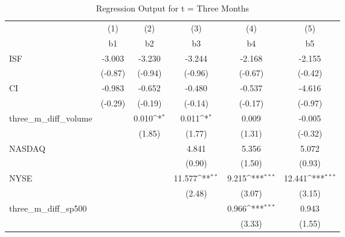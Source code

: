 \begin{table}[htbp]\centering
\def\sym#1{\ifmmode^{#1}\else\(^{#1}\)\fi}
\caption{Regression Output for t = Three Months}
\begin{tabular}{l*{5}{c}}
\hline\hline
            &\multicolumn{1}{c}{(1)}         &\multicolumn{1}{c}{(2)}         &\multicolumn{1}{c}{(3)}         &\multicolumn{1}{c}{(4)}         &\multicolumn{1}{c}{(5)}         \\
            &          b1         &          b2         &          b3         &          b4         &          b5         \\
\hline
ISF         &      -3.003         &      -3.230         &      -3.244         &      -2.168         &      -2.155         \\
            &     (-0.87)         &     (-0.94)         &     (-0.96)         &     (-0.67)         &     (-0.42)         \\
[1em]
CI          &      -0.983         &      -0.652         &      -0.480         &      -0.537         &      -4.616         \\
            &     (-0.29)         &     (-0.19)         &     (-0.14)         &     (-0.17)         &     (-0.97)         \\
[1em]
three\_m\_diff\_volume&                     &       0.010\sym{*}  &       0.011\sym{*}  &       0.009         &      -0.005         \\
            &                     &      (1.85)         &      (1.77)         &      (1.31)         &     (-0.32)         \\
[1em]
NASDAQ      &                     &                     &       4.841         &       5.356         &       5.072         \\
            &                     &                     &      (0.90)         &      (1.50)         &      (0.93)         \\
[1em]
NYSE        &                     &                     &      11.577\sym{**} &       9.215\sym{***}&      12.441\sym{***}\\
            &                     &                     &      (2.48)         &      (3.07)         &      (3.15)         \\
[1em]
three\_m\_diff\_sp500&                     &                     &                     &       0.966\sym{***}&       0.943         \\
            &                     &                     &                     &      (3.33)         &      (1.55)         \\

\end{tabular}
\end{table}
